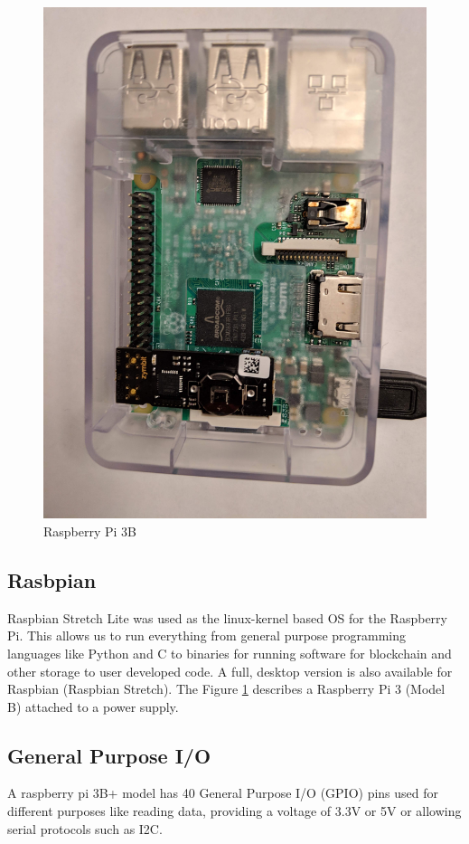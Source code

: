 \documentclass[11pt,openright]{report}
\begin{document}
\begin{figure}
	\centering
	\includegraphics[scale=0.1]{images/rpi.jpg}
	\caption{Raspberry Pi 3B}
	\label{fig:rpi}
\end{figure}


\newpage
\subsection{Rasbpian}
Raspbian Stretch Lite was used as the linux-kernel based OS for the Raspberry Pi. This allows us to run everything from general purpose programming languages like Python and C to binaries for running software for blockchain and other storage to user developed code. A full, desktop version is also available for Raspbian (Raspbian Stretch). The Figure \ref{fig:rpi} describes a Raspberry Pi 3 (Model B) attached to a power supply.
 
\subsection{General Purpose I/O}
A raspberry pi 3B+ model has 40 General Purpose I/O (GPIO) pins used for different purposes like reading data, providing a voltage of 3.3V or 5V or allowing serial protocols such as I2C.
\end{document}
